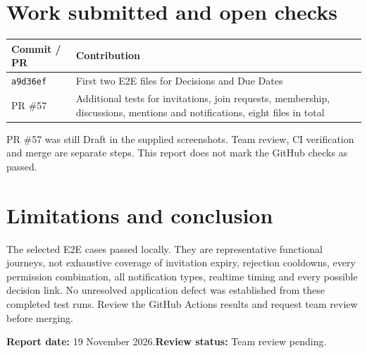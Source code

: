 \documentclass[11pt,a4paper]{article}
\begin{document}
\section{Work submitted and open checks}
\begin{center}\small{}
\begin{tabularx}{\linewidth}{l X}\toprule
\textbf{Commit / PR} & \textbf{Contribution}\\\midrule
\texttt{a9d36ef} & First two E2E files for Decisions and Due Dates\\
PR \#57 & Additional tests for invitations, join requests, membership, discussions, mentions and notifications, eight files in total\\
\bottomrule\end{tabularx}\end{center}
PR \#57 was still Draft in the supplied screenshots. Team review, CI verification and merge are separate steps. This report does not mark the GitHub checks as passed.
\section{Limitations and conclusion}
The selected E2E cases passed locally. They are representative functional journeys, not exhaustive coverage of invitation expiry, rejection cooldowns, every permission combination, all notification types, realtime timing and every possible decision link. No unresolved application defect was established from these completed test runs. Review the GitHub Actions results and request team review before merging.
\par\medskip\noindent\textbf{Report date:} 19 November 2026.\quad \textbf{Review status:} Team review pending.
\end{document}

